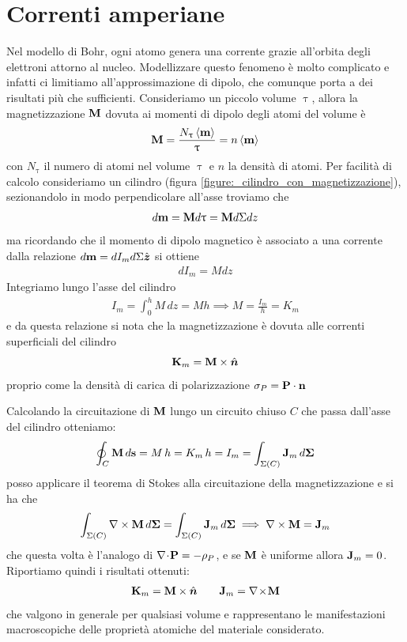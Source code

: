 \section{Correnti amperiane}
Nel modello di Bohr, ogni atomo genera una corrente grazie all'orbita degli elettroni attorno al nucleo. Modellizzare questo fenomeno è molto complicato 
e infatti ci limitiamo all'approssimazione di dipolo, che comunque porta a dei risultati più che sufficienti.
Consideriamo un piccolo volume $ \uptau $, allora la magnetizzazione $ \mathbf{ M } $ dovuta ai momenti di dipolo degli atomi del volume è
\begin{equation}
  \mathbf{ M } = \frac{N_{\uptau} \, \langle \mathbf{ m } \rangle}{\uptau} = n \, \langle \mathbf{ m } \rangle
\end{equation}
con $ N_{\uptau} $ il numero di atomi nel volume $ \uptau $ e $ n $ la densità di atomi. Per facilità di calcolo consideriamo un cilindro 
(figura \ref{figure:_cilindro_con_magnetizzazione}), sezionandolo in modo perpendicolare all'asse troviamo che
\begin{equation}
  d\mathbf{ m } = \mathbf{ M } d\uptau = \mathbf{ M } d\Sigma dz
\end{equation}
ma ricordando che il momento di dipolo magnetico è associato a una corrente dalla relazione $ d\mathbf{ m } = dI_m d\Sigma \hat{\boldsymbol{z}} $ si ottiene
\begin{align}
  dI_m = M dz
\end{align}
Integriamo lungo l'asse del cilindro
\begin{align}
  I_m = \int_0^h M \,dz = M h \implies M = \frac{I_m}{h} = K_m
\end{align}
e da questa relazione si nota che la magnetizzazione è dovuta alle correnti superficiali del cilindro
\begin{equation}
  \mathbf{ K }_m = \mathbf{ M } \times \hat{\boldsymbol{n}}
\end{equation}
proprio come la densità di carica di polarizzazione $ \sigma_P = \mathbf{ P \cdot n } $


Calcolando la circuitazione di $ \mathbf{ M } $ lungo un circuito chiuso $ C $ che passa dall'asse del cilindro otteniamo:
\begin{equation}
  \oint_C \mathbf{ M } \, d \mathbf{ s } = M \,h = K_m \, h = I_m = \int_{\Sigma(C)} \mathbf{ J }_m \,d\mathbf{ \Sigma }
\end{equation}
posso applicare il teorema di Stokes alla circuitazione della magnetizzazione e si ha che
\begin{equation}
  \int_{\Sigma(C)} \mathbf{\nabla}\times\mathbf{ M } \,d\mathbf{ \Sigma } = \int_{\Sigma(C)} \mathbf{ J }_m \,d\mathbf{ \Sigma }
  \implies \mathbf{\nabla}\times\mathbf{ M } = \mathbf{ J }_m
\end{equation}
che questa volta è l'analogo di $ \displaystyle \nabla\!\cdot\!\mathbf{ P } = - \rho_P $, e se $ \mathbf{ M } $ è uniforme allora $ \mathbf{ J }_m = 0 $. 
Riportiamo quindi i risultati ottenuti:
\begin{align}
  \mathbf{ K }_m = \mathbf{ M } \times \hat{\boldsymbol{n}} \qquad \mathbf{ J }_m = \nabla\!\times\!\mathbf{ M }
\end{align}
che valgono in generale per qualsiasi volume e rappresentano le manifestazioni macroscopiche delle proprietà atomiche del materiale considerato.

